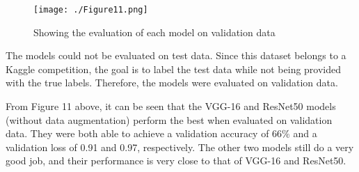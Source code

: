 \documentclass[
]{article}
\begin{document}
%

\begin{figure}[hbt!]
  \centering
  \texttt{[image: ./Figure11.png]}
  \caption{Showing the evaluation of each model on validation data}
  \label{fig:figure5}
\end{figure}

The models could not be evaluated on test data. Since this dataset
belongs to a Kaggle competition, the goal is to label the test data
while not being provided with the true labels. Therefore, the models
were evaluated on validation data.

From Figure 11 above, it can be seen that the VGG-16 and ResNet50 models
(without data augmentation) perform the best when evaluated on
validation data. They were both able to achieve a validation accuracy of
66\% and a validation loss of 0.91 and 0.97, respectively. The other two
models still do a very good job, and their performance is very close to
that of VGG-16 and ResNet50.
\end{document}
